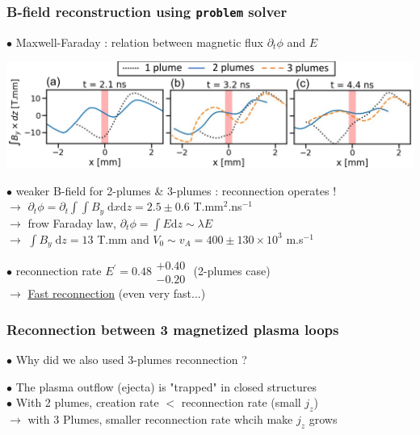 \documentclass{beamer}
\newcommand{\D}{{\mathrm d}}
\begin{document}
\begin{frame}
\frametitle{B-field reconstruction using \texttt{problem} solver}

$\bullet$ Maxwell-Faraday : relation between magnetic flux $\partial_t \phi$ and $E$ \\

\begin{center}
\includegraphics[width=1.0\textwidth]{problem.png}
\end{center}

$\bullet$ weaker B-field for 2-plumes \& 3-plumes : reconnection operates ! \\
$\to$ $\partial_t \phi = \partial_t \int \!\!\! \int B_y \; \D x \D z = 2.5 \pm 0.6$ T.mm$^2$.ns$^{-1}$ \\
$\to$ frow Faraday law, $\partial_t \phi = \int E \D z \sim \lambda E$ \\
$\to$ $\int B_y \; \D z = 13$ T.mm and $V_0 \sim v_A = 400 \pm 130 \times 10^3$ m.s$^{-1}$ \\

\bigskip

$\bullet$ reconnection rate $E^{\prime} = 0.48 \substack{+0.40 \\ -0.20}$ (2-plumes case) \\
$\to$ \underline{Fast reconnection} (even very fast...) \\

\end{frame}



\begin{frame}
\frametitle{Reconnection between 3 magnetized plasma loops}

$\bullet$ Why did we also used 3-plumes reconnection ?
\begin{center}

\end{center}

$\bullet$ The plasma outflow (ejecta) is "trapped" in closed structures \\
$\bullet$ With 2 plumes, creation rate $<$ reconnection rate (small $j_z$) \\
$\to$ with 3 Plumes, smaller reconnection rate whcih make $j_z$ grows \\

\end{frame}
\end{document}
